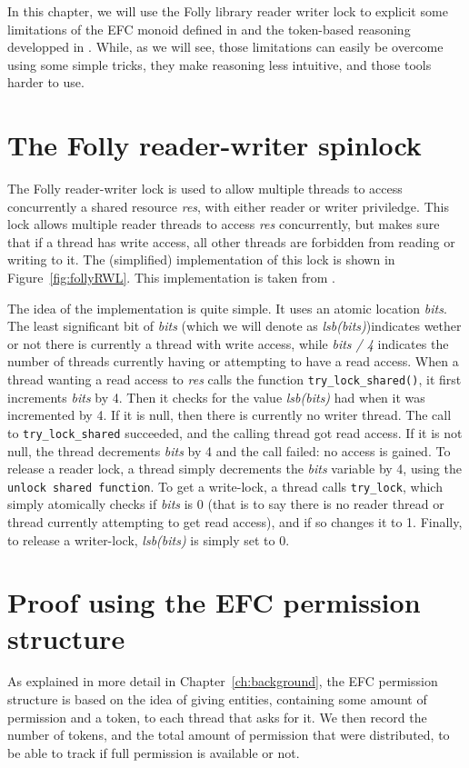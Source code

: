 In this chapter, we will use the Folly library reader writer lock \cite{follyRW} to explicit some limitations of the EFC monoid defined in \cite{gaurav} and the token-based reasoning developped in \cite{pascal}. While, as we will see, those limitations can easily be overcome using some simple tricks, they make reasoning less intuitive, and those tools harder to use.

\section{The Folly reader-writer spinlock}
The Folly reader-writer lock is used to allow multiple threads to access concurrently a shared resource \emph{res}, with either reader or writer priviledge. This lock allows multiple reader threads to access \emph{res} concurrently, but makes sure that if a thread has write access, all other threads are forbidden from reading or writing to it. The (simplified) implementation of this lock is shown in Figure~\ref{fig:follyRWL}. This implementation is taken from \cite{gaurav}.

The idea of the implementation is quite simple. It uses an atomic location \emph{bits}. The least significant bit of \emph{bits} (which we will denote as \emph{lsb(bits)})indicates wether or not there is currently a thread with write access, while \emph{bits / 4} indicates the number of threads currently having or attempting to have a read access. When a thread wanting a read access to \emph{res} calls the function \texttt{try\_lock\_shared()}, it first increments \emph{bits} by 4. Then it checks for the value \emph{lsb(bits)} had when it was incremented by 4. If it is null, then there is currently no writer thread. The call to \texttt{try\_lock\_shared} succeeded, and the calling thread got read access. If it is not null, the thread decrements \emph{bits} by 4 and the call failed: no access is gained. To release a reader lock, a thread simply decrements the \emph{bits} variable by 4, using the \texttt{unlock shared function}. To get a write-lock, a thread calls \texttt{try\_lock}, which simply atomically checks if \emph{bits} is 0 (that is to say there is no reader thread or thread currently attempting to get read access), and if so changes it to 1. Finally, to release a writer-lock, \emph{lsb(bits)} is simply set to 0.

\section{Proof using the EFC permission structure}
As explained in more detail in Chapter~\ref{ch:background}, the EFC permission structure is based on the idea of giving entities, containing some amount of permission and a token, to each thread that asks for it. We then record the number of tokens, and the total amount of permission that were distributed, to be able to track if full permission is available or not. 

